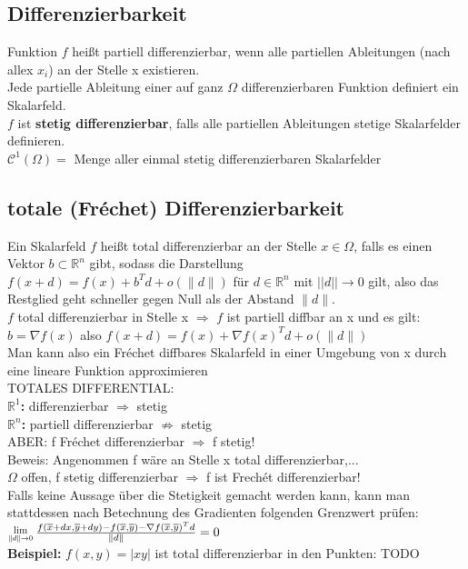 \documentclass[german]{latex4ei/latex4ei_sheet}
\begin{document}
\begin{sectionbox}	
	\subsection{Differenzierbarkeit}
	Funktion $f$ hei\ss{}t partiell differenzierbar, wenn alle partiellen Ableitungen (nach allex $x_i$) an der Stelle x existieren.\\
	Jede partielle Ableitung einer auf ganz $\Omega$ differenzierbaren Funktion definiert ein Skalarfeld.\\
	$f$ ist \textbf{stetig differenzierbar}, falls alle partiellen Ableitungen stetige Skalarfelder definieren.\\
	$\mathcal{C}^1(\Omega) = $ Menge aller einmal stetig differenzierbaren Skalarfelder

	
	\subsection{totale (Fr\'{e}chet) Differenzierbarkeit}
	Ein Skalarfeld $f$ hei\ss{}t total differenzierbar an der Stelle $x \in \Omega$, falls es einen Vektor $b \subset \mathbb{R}^n$ gibt, sodass die Darstellung $f(x+d)=f(x) + b^Td + o(\|d\|)$ f\"ur $d \in \mathbb{R}^n$ mit $||d|| \rightarrow 0$ gilt, also das Restglied geht schneller gegen Null als der Abstand $\| d \|$.\\
  $f$ total differenzierbar in Stelle x $\Rightarrow$ $f$ ist partiell diffbar an x und es gilt: $b=\nabla f(x)$ also $f(x+d)=f(x)+\nabla f(x)^T d + o(\|d\|)$\\
	Man kann also ein Fr\'echet diffbares Skalarfeld in einer Umgebung von x durch eine lineare Funktion approximieren\\
	TOTALES DIFFERENTIAL:\\
	\textbf{ $\mathbb{R}^1$:} differenzierbar $\Rightarrow$ stetig\\
	\textbf{ $\mathbb{R}^n$:} partiell differenzierbar $\nRightarrow$ stetig\\
  ABER: f Fr\'echet differenzierbar $\Rightarrow$ f stetig!\\
	Beweis: Angenommen f w\"are an Stelle x total differenzierbar,...\\
	$\Omega$ offen, f stetig differenzierbar $\Rightarrow$ f ist Frech\'et differenzierbar!\\
	Falls keine Aussage \"uber die Stetigkeit gemacht werden kann, kann man stattdessen nach Betechnung des Gradienten folgenden Grenzwert pr\"ufen: $\Lim{\|d\| \to 0} \frac{f(\overline{x}+dx,\overline{y}+dy)-f(\overline{x},\overline{y}) - \nabla f(\overline{x},\overline{y})^T d}{\|d\|}=0$\\
	\textbf{Beispiel:} $f(x,y)=|x y|$ ist total differenzierbar in den Punkten: TODO
	

\end{sectionbox}
\end{document}
